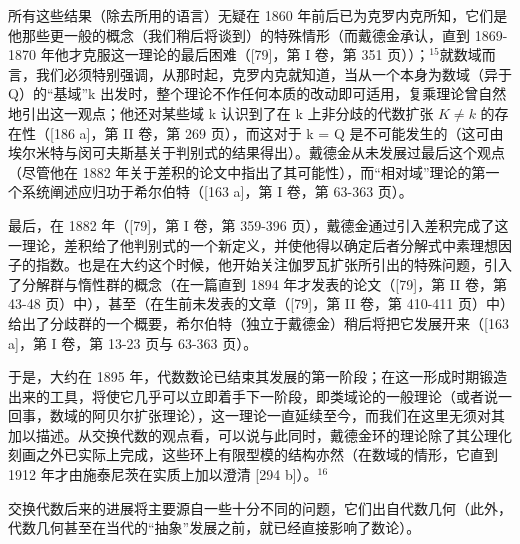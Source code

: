 所有这些结果（除去所用的语言）无疑在 1860 年前后已为克罗内克所知，它们是他那些更一般的概念（我们稍后将谈到）的特殊情形（而戴德金承认，直到 1869-1870 年他才克服这一理论的最后困难（{[}79{]}，第 I 卷，第 351 页））；\(^{15}\)就数域而言，我们必须特别强调，从那时起，克罗内克就知道，当从一个本身为数域（异于 Q）的“基域”k 出发时，整个理论不作任何本质的改动即可适用，复乘理论曾自然地引出这一观点；他还对某些域 k 认识到了在 k 上非分歧的代数扩张 \(K \neq k\) 的存在性（{[}186 a{]}，第 II 卷，第 269 页），而这对于 k = Q 是不可能发生的（这可由埃尔米特与闵可夫斯基关于判别式的结果得出）。戴德金从未发展过最后这个观点（尽管他在 1882 年关于差积的论文中指出了其可能性），而“相对域”理论的第一个系统阐述应归功于希尔伯特（{[}163 a{]}，第 I 卷，第 63-363 页）。

最后，在 1882 年（{[}79{]}，第 I 卷，第 359-396 页），戴德金通过引入差积完成了这一理论，差积给了他判别式的一个新定义，并使他得以确定后者分解式中素理想因子的指数。也是在大约这个时候，他开始关注伽罗瓦扩张所引出的特殊问题，引入了分解群与惰性群的概念（在一篇直到 1894 年才发表的论文（{[}79{]}，第 II 卷，第 43-48 页）中），甚至（在生前未发表的文章（{[}79{]}，第 II 卷，第 410-411 页）中）给出了分歧群的一个概要，希尔伯特（独立于戴德金）稍后将把它发展开来（{[}163 a{]}，第 I 卷，第 13-23 页与 63-363 页）。

于是，大约在 1895 年，代数数论已结束其发展的第一阶段；在这一形成时期锻造出来的工具，将使它几乎可以立即着手下一阶段，即类域论的一般理论（或者说一回事，数域的阿贝尔扩张理论），这一理论一直延续至今，而我们在这里无须对其加以描述。从交换代数的观点看，可以说与此同时，戴德金环的理论除了其公理化刻画之外已实际上完成，这些环上有限型模的结构亦然（在数域的情形，它直到 1912 年才由施泰尼茨在实质上加以澄清 {[}294 b{]}）。\(^{16}\)

交换代数后来的进展将主要源自一些十分不同的问题，它们出自代数几何（此外，代数几何甚至在当代的“抽象”发展之前，就已经直接影响了数论）。

